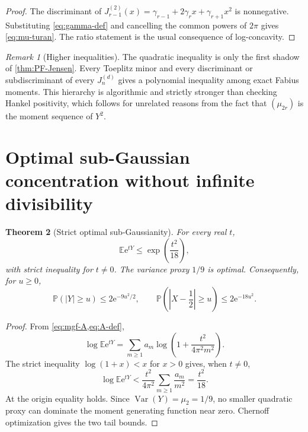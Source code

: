 \documentclass[11pt,oneside]{article}
\newtheorem{theorem}{Theorem}[section]
\theoremstyle{definition}
\theoremstyle{remark}
\newtheorem{remark}[theorem]{Remark}
\newcommand{\e}{\mathrm e}
\newcommand{\Var}{\operatorname{Var}}
\newcommand{\E}{\mathbb E}
\newcommand{\Prob}{\mathbb P}
\begin{document}
\begin{proof}
The discriminant of
$J_{r-1}^{(2)}(x)=\gamma_{r-1}+2\gamma_rx+\gamma_{r+1}x^2$
is nonnegative.  Substituting \cref{eq:gamma-def} and cancelling the common
powers of $2\pi$ gives \cref{eq:mu-turan}.  The ratio statement is the usual
consequence of log-concavity.
\end{proof}

\begin{remark}[Higher inequalities]
The quadratic inequality is only the first shadow of
\cref{thm:PF-Jensen}.  Every Toeplitz minor and every discriminant or subdiscriminant
of every $J_n^{(d)}$ gives a polynomial inequality among exact Fabius moments.
This hierarchy is algorithmic and strictly stronger than checking Hankel
positivity, which follows for unrelated reasons from the fact that
$(\mu_{2r})$ is the moment sequence of $Y^2$.
\end{remark}

\section{Optimal sub-Gaussian concentration without infinite divisibility}

\begin{theorem}[Strict optimal sub-Gaussianity]\label{thm:subgaussian}
For every real $t$,
\begin{equation}\label{eq:subgaussian}
 \E\e^{tY}\le\exp\!\left(\frac{t^2}{18}\right),
\end{equation}
with strict inequality for $t\ne0$.  The variance proxy $1/9$ is optimal.
Consequently, for $u\ge0$,
\begin{equation}\label{eq:tails-YX}
 \Prob(|Y|\ge u)\le2\e^{-9u^2/2},\qquad
 \Prob\!\left(\left|X-\frac12\right|\ge u\right)
 \le2\e^{-18u^2}.
\end{equation}
\end{theorem}

\begin{proof}
From \cref{eq:mgf-A,eq:A-def},
\[
 \log\E\e^{tY}
 =\sum_{m\ge1}a_m
 \log\!\left(1+\frac{t^2}{4\pi^2m^2}\right).
\]
The strict inequality $\log(1+x)<x$ for $x>0$ gives, when $t\ne0$,
\[
 \log\E\e^{tY}<\frac{t^2}{4\pi^2}
 \sum_{m\ge1}\frac{a_m}{m^2}
 =\frac{t^2}{18}.
\]
At the origin equality holds.  Since $\Var(Y)=\mu_2=1/9$, no smaller
quadratic proxy can dominate the moment generating function near zero.
Chernoff optimization gives the two tail bounds.
\end{proof}
\end{document}
